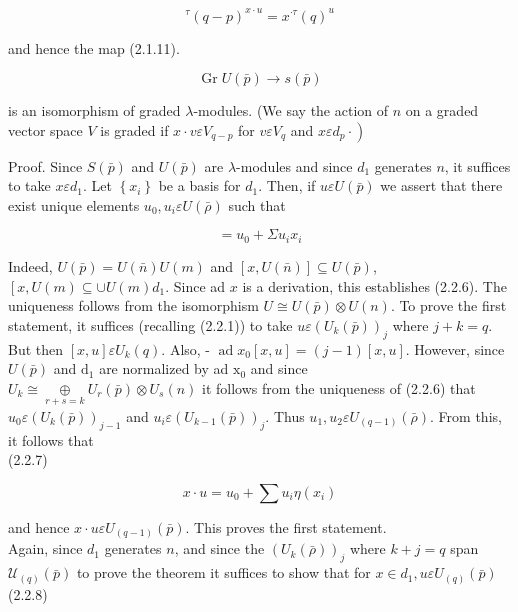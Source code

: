 \documentclass[10pt]{article}
\begin{document}
$$
{ }^{\tau}(q-p)^{x \cdot u}=x^{\cdot \tau}(q)^{u}
$$

and hence the map (2.1.11).


\begin{equation*}
\operatorname{Gr} U(\bar{p}) \rightarrow s(\bar{p}) \tag{2.2.5}
\end{equation*}


is an isomorphism of graded $\lambda$-modules. (We say the action of $n$ on a graded vector space $V$ is graded if $x \cdot v \varepsilon V_{q-p}$ for $v \varepsilon V_{q}$ and $\left.x \varepsilon d_{p} \cdot\right)$

Proof. Since $S(\bar{p})$ and $U(\bar{p})$ are $\lambda$-modules and since $d_{1}$ generates $n$, it suffices to take $x \varepsilon d_{1}$. Let $\left\{x_{i}\right\}$ be a basis for $d_{1}$. Then, if $u \varepsilon U(\bar{p})$ we assert that there exist unique elements $u_{0}, u_{i} \varepsilon U(\bar{\rho})$ such that


\begin{equation*}
[x, u]=u_{0}+\Sigma u_{i} x_{i} \tag{2.2.6}
\end{equation*}


Indeed, $U(\bar{p})=U(\bar{n}) U(m)$ and $[x, U(\bar{n})] \subseteq U(\bar{p})$, $\left[x, U(m) \subseteq \cup U(m) d_{1}\right.$. Since ad $x$ is a derivation, this establishes (2.2.6). The uniqueness follows from the isomorphism $U \cong U(\bar{p}) \otimes U(n)$. To prove the first statement, it suffices (recalling (2.2.1)) to take $u \varepsilon\left(U_{k}(\bar{p})\right)_{j}$ where $j+k=q$. But then $[x, u] \varepsilon U_{k}(q)$. Also, - $\operatorname{ad} x_{0}[x, u]=(j-1)[x, u]$. However, since $U(\bar{p})$ and $\mathrm{d}_{1}$ are normalized by ad $\mathrm{x}_{0}$ and since\\
$U_{k} \cong \underset{r+s=k}{\oplus} U_{r}(\bar{p}) \otimes U_{s}(n)$ it follows from the uniqueness of (2.2.6) that $u_{0} \varepsilon\left(U_{k}(\bar{p})\right)_{j-1}$ and $u_{i} \varepsilon\left(U_{k-1}(\bar{p})\right)_{j}$. Thus $u_{1}, u_{2} \varepsilon U_{(q-1)}(\bar{\rho})$. From this, it follows that\\
(2.2.7)

$$
x \cdot u=u_{0}+\sum u_{i} \eta\left(x_{i}\right)
$$

and hence $x \cdot u \varepsilon U_{(q-1)}(\bar{p})$. This proves the first statement.\\
Again, since $d_{1}$ generates $n$, and since the $\left(U_{k}(\bar{\rho})\right)_{j}$ where $k+j=q$ span $\mathcal{U}_{(q)}(\bar{p})$ to prove the theorem it suffices to show that for $x \in d_{1}, u \varepsilon U_{(q)}(\bar{p})$\\
(2.2.8)
\end{document}
